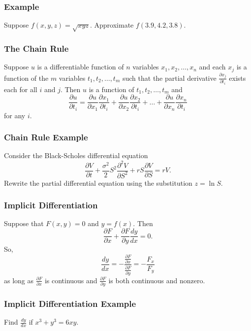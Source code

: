 \documentclass{beamer}
\begin{document}
\begin{frame}[t]
\frametitle{Example}
\begin{Example}
Suppose $f(x, y, z) = \sqrt{xyz}$. Approximate $f(3.9, 4.2, 3.8)$.
\end{Example}

\end{frame}

\begin{frame}
\frametitle{The Chain Rule}

Suppose $u$ is a differentiable function of $n$ variables $x_1, x_2,\ldots, x_n$ and each $x_j$ is a function of the $m$ variables $t_1, t_2,\ldots, t_m$ such that the partial derivative $\frac{\partial x_j}{\partial t_i}$ exists each for all $i$ and $j$. Then $u$ is a function of $t_1, t_2,\ldots, t_m$ and
$$
\frac{\partial u}{\partial t_i} = \frac{\partial u}{\partial x_1}\frac{\partial x_1}{\partial t_i} + \frac{\partial u}{\partial x_2}\frac{\partial x_2}{\partial t_i} + \ldots + \frac{\partial u}{\partial x_n}\frac{\partial x_n}{\partial t_i}
$$
for any $i$.

\end{frame}

\begin{frame}[t]
\frametitle{Chain Rule Example}
\begin{Example}
Consider the Black-Scholes differential equation
$$
\frac{\partial V}{\partial t} + \frac{\sigma^2}{2} S^2 \frac{\partial^2 V}{\partial S^2} + r S \frac{\partial V}{\partial S} = r V.
$$
Rewrite the partial differential equation using the substitution $z = \ln S$.
\end{Example}

\end{frame}

\begin{frame}
\frametitle{Implicit Differentiation}
Suppose that $F(x, y) = 0$ and $y = f(x)$. Then
$$
\frac{\partial F}{\partial x} + \frac{\partial F}{\partial y} \frac{d y}{d x} = 0.
$$
So,
$$
\frac{dy}{dx} = -\frac{\frac{\partial F}{\partial x}}{\frac{\partial F}{\partial y}}= - \frac{F_x}{F_y}
$$
as long as $\frac{\partial F}{\partial x}$ is continuous and $\frac{\partial F}{\partial y}$ is both continuous and nonzero.
\end{frame}

\begin{frame}[t]
\frametitle{Implicit Differentiation Example}
\begin{Example}
Find $\frac{dy}{dx}$ if $x^3 + y^3 = 6xy$.
\end{Example}
\end{frame}
\end{document}
